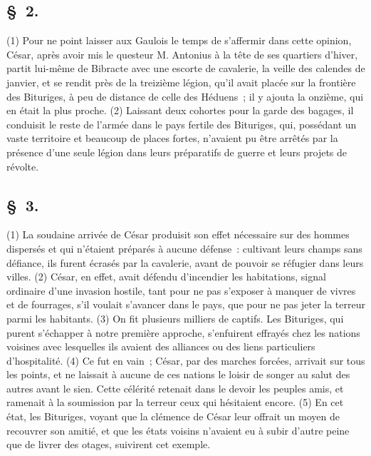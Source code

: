 \documentclass[french,twoside]{book} %
\begin{document}
\subsection[{§ 2.}]{ \textsc{§ 2.} }
\noindent (1) Pour ne point laisser aux Gaulois le temps de s’affermir dans cette opinion, César, après avoir mis le questeur M. Antonius à la tête de ses quartiers d’hiver, partit lui-même de Bibracte avec une escorte de cavalerie, la veille des calendes de janvier, et se rendit près de la treizième légion, qu’il avait placée sur la frontière des Bituriges, à peu de distance de celle des Héduens ; il y ajouta la onzième, qui en était la plus proche. (2) Laissant deux cohortes pour la garde des bagages, il conduisit le reste de l’armée dans le pays fertile des Bituriges, qui, possédant un vaste territoire et beaucoup de places fortes, n’avaient pu être arrêtés par la présence d’une seule légion dans leurs préparatifs de guerre et leurs projets de révolte.
\subsection[{§ 3.}]{ \textsc{§ 3.} }
\noindent (1) La soudaine arrivée de César produisit son effet nécessaire sur des hommes dispersés et qui n’étaient préparés à aucune défense : cultivant leurs champs sans défiance, ils furent écrasés par la cavalerie, avant de pouvoir se réfugier dans leurs villes. (2) César, en effet, avait défendu d’incendier les habitations, signal ordinaire d’une invasion hostile, tant pour ne pas s’exposer à manquer de vivres et de fourrages, s’il voulait s’avancer dans le pays, que pour ne pas jeter la terreur parmi les habitants. (3) On fit plusieurs milliers de captifs. Les Bituriges, qui purent s’échapper à notre première approche, s’enfuirent effrayés chez les nations voisines avec lesquelles ils avaient des alliances ou des liens particuliers d’hospitalité. (4) Ce fut en vain ; César, par des marches forcées, arrivait sur tous les points, et ne laissait à aucune de ces nations le loisir de songer au salut des autres avant le sien. Cette célérité retenait dans le devoir les peuples amis, et ramenait à la soumission par la terreur ceux qui hésitaient encore. (5) En cet état, les Bituriges, voyant que la clémence de César leur offrait un moyen de recouvrer son amitié, et que les états voisins n’avaient eu à subir d’autre peine que de livrer des otages, suivirent cet exemple.
\end{document}
